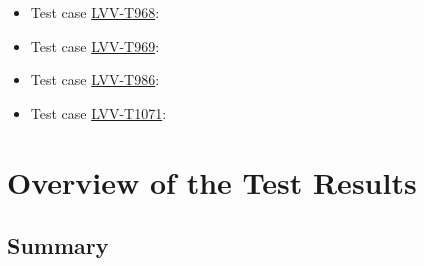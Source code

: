 \documentclass[DM,lsstdraft,STR,toc]{lsstdoc}
\begin{document}
\begin{itemize}
\begin{itemize}
    \item Test case \href{https://jira.lsstcorp.org/secure/Tests.jspa#/testCase/LVV-T968}{LVV-T968}: 
    \item Test case \href{https://jira.lsstcorp.org/secure/Tests.jspa#/testCase/LVV-T969}{LVV-T969}: 
    \item Test case \href{https://jira.lsstcorp.org/secure/Tests.jspa#/testCase/LVV-T986}{LVV-T986}: 
    \item Test case \href{https://jira.lsstcorp.org/secure/Tests.jspa#/testCase/LVV-T1071}{LVV-T1071}: 
  \end{itemize}
\end{itemize}

\newpage

\section{Overview of the Test Results}
\label{sect:overview}

\subsection{Summary}
\label{sect:summarytable}
\end{document}
